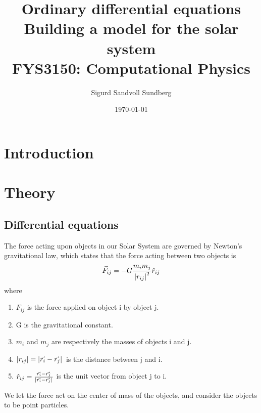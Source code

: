 \documentclass[%
reprint,
nofootinbib,
amsmath,amssymb,
aps,
]{revtex4-1}
\begin{document}
	
\title{Ordinary differential equations\\
	\normalsize{Building a model for the solar system} \\
	\hrulefill\small{ FYS3150: Computational Physics }\hrulefill}

\author{Sigurd Sandvoll Sundberg}

%

\date{\today}

\begin{abstract}%

\end{abstract}

\maketitle 

\section{Introduction} %

\section{Theory}
\subsection{Differential equations}
The force acting upon objects in our Solar System are governed by Newton's gravitational law, which states that the force acting between two objects is 
\begin{equation}
	\vec{F}_{ij} =  -G \frac{m_im_j}{\abs{r_{ij}}^2}\hat{r}_{ij}
\end{equation}
where 
\begin{enumerate}
	\item	$F_{ij}$ is the force applied on object i by object j.
	\item G is the gravitational constant.
	\item	$m_i$ and $m_j$ are respectively the masses of objects i and j. 
	\item $\abs{r_{ij}} = \abs{\vec{r_i} - \vec{r_j}}$ is the distance between j and i.
	\item	$\hat{r}_{ij} = \frac{\vec{r_i}-\vec{r_j}}{\abs{\vec{r_i} - \vec{r_j}}}$ is the unit vector from object j to i.
\end{enumerate}
We let the force act on the center of mass of the objects, and consider the objects to be point particles. 
\end{document}
